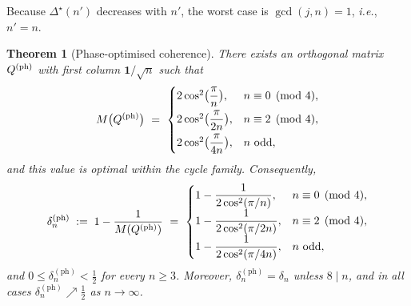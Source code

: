 \documentclass[12pt,fleqn]{amsart}
\renewcommand{\le}{\leqslant}
\renewcommand{\ge}{\geqslant}
\newtheorem{thm}{Theorem}
\theoremstyle{remark}
\newcommand{\1}{\mathbf{1}}
\begin{document}
Because $\Delta^\star(n')$ decreases with $n'$, the worst case is $\gcd(j,n)=1$, \emph{i.e.},\ $n'=n$.

\begin{thm}[Phase-optimised coherence]\label{thm:phase-correct}
There exists an orthogonal matrix $Q^{\rm (ph)}$ with first column $\1/\sqrt n$ such that
\[
M\big(Q^{\rm (ph)}\big)\ =\
\begin{cases}
2\cos^2\!\big(\dfrac{\pi}{n}\big),   & n\equiv 0\pmod{4},\\[2mm]
2\cos^2\!\big(\dfrac{\pi}{2n}\big),  & n\equiv 2\pmod{4},\\[2mm]
2\cos^2\!\big(\dfrac{\pi}{4n}\big),  & n\ \mathrm{odd},
\end{cases}
\]
and this value is optimal within the cycle family.
Consequently,
\[
\delta^{\mathrm{(ph)}}_n \;:=\;
1-\frac{1}{ M(Q^{\rm (ph)})}
\ =\
\begin{cases}
\displaystyle 1-\dfrac{1}{2\cos^2(\pi/n)},   & n\equiv 0\pmod{4},\\[2mm]
\displaystyle 1-\dfrac{1}{2\cos^2(\pi/2n)},  & n\equiv 2\pmod{4},\\[2mm]
\displaystyle 1-\dfrac{1}{2\cos^2(\pi/4n)},  & n\ \text{odd},
\end{cases}
\]
and $0\le \delta^{\mathrm{(ph)}}_n<\tfrac12$ for every $n\ge 3$. Moreover, $\delta^{\mathrm{(ph)}}_n=\delta_n$ unless $8\mid n$, and in all cases $\delta^{\mathrm{(ph)}}_n \nearrow \tfrac12$ as $n\to\infty$.
\end{thm}
\end{document}
